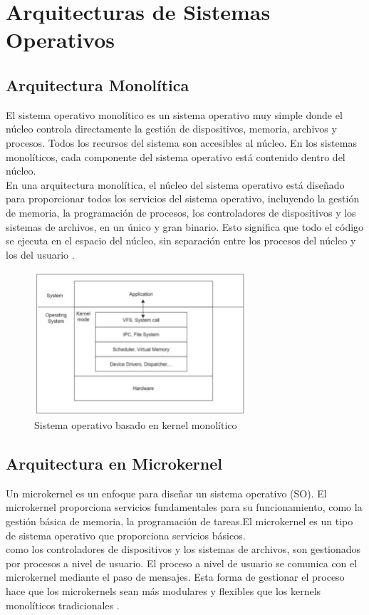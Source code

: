 

\section{Arquitecturas de Sistemas Operativos}
\subsection{Arquitectura Monolítica}
El sistema operativo monolítico es un sistema operativo muy simple donde el núcleo controla directamente la gestión de dispositivos, memoria, archivos y procesos. Todos los recursos del sistema son accesibles al núcleo. En los sistemas monolíticos, cada componente del sistema operativo está contenido dentro del núcleo.\\
En una arquitectura monolítica, el núcleo del sistema operativo está diseñado para proporcionar todos los servicios del sistema operativo, incluyendo la gestión de memoria, la programación de procesos, los controladores de dispositivos y los sistemas de archivos, en un único y gran binario. Esto significa que todo el código se ejecuta en el espacio del núcleo, sin separación entre los procesos del núcleo y los del usuario \citep{geeks_monolithic}.


\begin{figure}[H]
    \centering
    \includegraphics[width=0.7\textwidth]{figures/monolitica.jpeg}
    \caption[Sistema operativo basado en kernel monolítico]%
            {Sistema operativo basado en kernel monolítico \citep{harshvardhan2023kernels}}
    \label{fig:arquitectura_monolitica}
\end{figure}

\subsection{Arquitectura en Microkernel}
Un microkernel es un enfoque para diseñar un sistema operativo (SO). El microkernel proporciona servicios fundamentales para su funcionamiento, como la gestión básica de memoria, la programación de tareas.El microkernel es un tipo de sistema operativo que proporciona servicios básicos.\\
como los controladores de dispositivos y los sistemas de archivos, son gestionados por procesos a nivel de usuario. El proceso a nivel de usuario se comunica con el microkernel mediante el paso de mensajes. Esta forma de gestionar el proceso hace que los microkernels sean más modulares y flexibles que los kernels monolíticos tradicionales \citep{geeks_microkernel}.


